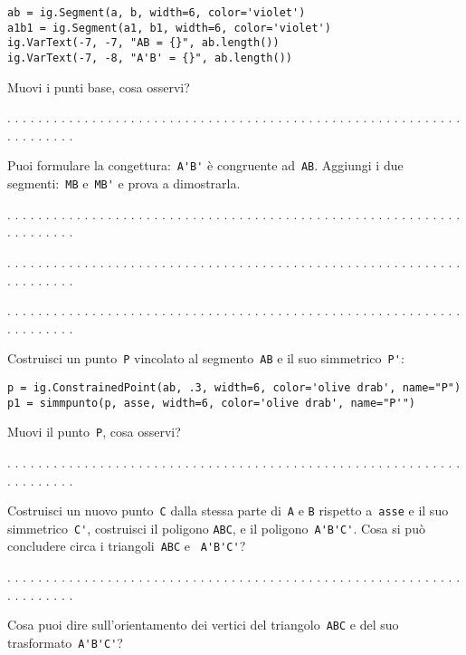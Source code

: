 \begin{lstlisting}
ab = ig.Segment(a, b, width=6, color='violet')
a1b1 = ig.Segment(a1, b1, width=6, color='violet')
ig.VarText(-7, -7, "AB = {}", ab.length())
ig.VarText(-7, -8, "A'B' = {}", ab.length())
\end{lstlisting}

Muovi i punti base, cosa osservi?

. . . . . . . . . . . . . . . . . . . . . . . . . . . . . . . . . . . . . . . .
. . . . . . . . . . . . . . . . . . . . . . . . . . . .

Puoi formulare la congettura:~\lstinline{A'B'} è congruente ad~\lstinline{AB}.
Aggiungi i due segmenti:~\lstinline{MB} e~\lstinline{MB'} e prova a dimostrarla.

. . . . . . . . . . . . . . . . . . . . . . . . . . . . . . . . . . . . . . . .
. . . . . . . . . . . . . . . . . . . . . . . . . . . .

. . . . . . . . . . . . . . . . . . . . . . . . . . . . . . . . . . . . . . . .
. . . . . . . . . . . . . . . . . . . . . . . . . . . .

. . . . . . . . . . . . . . . . . . . . . . . . . . . . . . . . . . . . . . . .
. . . . . . . . . . . . . . . . . . . . . . . . . . . .

Costruisci un punto~\lstinline{P} vincolato al segmento~\lstinline{AB} e il suo
simmetrico~\lstinline{P'}:

\begin{lstlisting}
p = ig.ConstrainedPoint(ab, .3, width=6, color='olive drab', name="P")
p1 = simmpunto(p, asse, width=6, color='olive drab', name="P'")
\end{lstlisting}

Muovi il punto~\lstinline{P}, cosa osservi?

. . . . . . . . . . . . . . . . . . . . . . . . . . . . . . . . . . . . . . . .
. . . . . . . . . . . . . . . . . . . . . . . . . . . .

Costruisci un nuovo punto~\lstinline{C} dalla stessa parte di~\lstinline{A} e 
\lstinline{B} rispetto
a~\lstinline{asse} e il suo simmetrico~\lstinline{C'}, costruisci il poligono 
\lstinline{ABC}, e il poligono~\lstinline{A'B'C'}.
Cosa si può concludere circa i triangoli~\lstinline{ABC} e ~\lstinline{A'B'C'}?

. . . . . . . . . . . . . . . . . . . . . . . . . . . . . . . . . . . . . . . .
. . . . . . . . . . . . . . . . . . . . . . . . . . . .

Cosa puoi dire sull'orientamento dei vertici del triangolo~\lstinline{ABC} e 
del suo trasformato~\lstinline{A'B'C'}?

